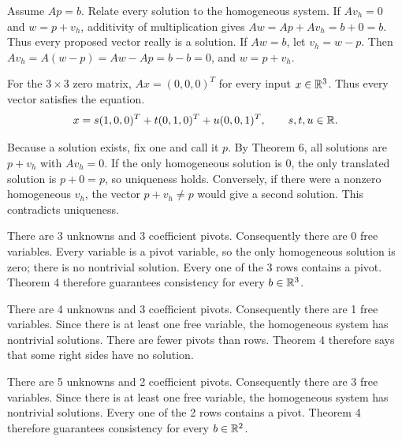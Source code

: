 \goal Assume $Ap=b$. Relate every solution to the homogeneous system.
If $Av_h=0$ and $w=p+v_h$, additivity of multiplication gives
$Aw=Ap+Av_h=b+0=b$. Thus every proposed vector really is a solution.
If $Aw=b$, let $v_h=w-p$. Then
$Av_h=A(w-p)=Aw-Ap=b-b=0$, and $w=p+v_h$.

For the $3\times3$ zero matrix, $Ax=(0,0,0)^T$ for every input
$x\in\mathbb{R}^3$. Thus every vector satisfies the equation.
\[x=s(1,0,0)^T+t(0,1,0)^T+u(0,0,1)^T,\qquad s,t,u\in\mathbb{R}.\]

Because a solution exists, fix one and call it $p$. By Theorem 6,
all solutions are $p+v_h$ with $Av_h=0$.
If the only homogeneous solution is $0$, the only translated
solution is $p+0=p$, so uniqueness holds.
Conversely, if there were a nonzero homogeneous $v_h$, the vector
$p+v_h\ne p$ would give a second solution. This contradicts
uniqueness.

There are 3 unknowns and 3 coefficient pivots.
Consequently there are 0 free variables.
Every variable is a pivot variable, so the only homogeneous
solution is zero; there is no nontrivial solution.
Every one of the 3 rows contains a pivot. Theorem 4 therefore
guarantees consistency for every $b\in\mathbb{R}^{3}$.

There are 4 unknowns and 3 coefficient pivots.
Consequently there are 1 free variables.
Since there is at least one free variable, the homogeneous
system has nontrivial solutions.
There are fewer pivots than rows. Theorem 4 therefore says that
some right sides have no solution.

There are 5 unknowns and 2 coefficient pivots.
Consequently there are 3 free variables.
Since there is at least one free variable, the homogeneous
system has nontrivial solutions.
Every one of the 2 rows contains a pivot. Theorem 4 therefore
guarantees consistency for every $b\in\mathbb{R}^{2}$.


